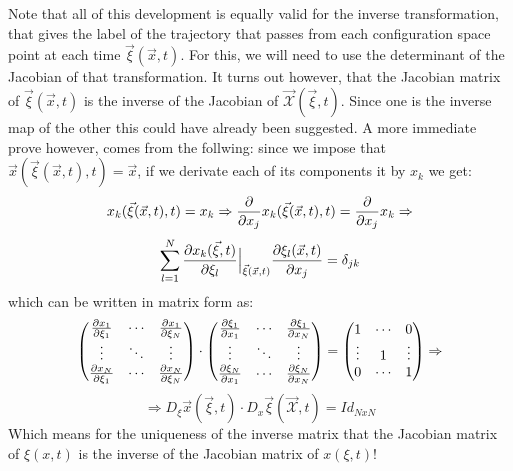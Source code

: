 \documentclass[11pt, a4paper]{article} %
\newcommand{\x}{\mathcal{X}}
\begin{document}
{Note that all of this development is equally valid for the inverse transformation, that gives the label of the trajectory that passes from each configuration space point at each time $\vec{\xi}(\vec{x},t)$. For this, we will need to use the determinant of the Jacobian of that transformation. It turns out however, that the Jacobian matrix of $\vec{\xi}(\vec{x},t)$ is the inverse of the Jacobian of $\vec{\x}(\vec{\xi},t)$. Since one is the inverse map of the other this could have already been suggested. A more immediate prove however, comes from the follwing: since we impose that $\vec{x}(\vec{\xi}(\vec{x},t),t)=\vec{x}$, if we derivate each of its components it by $x_k$ we get:
\begin{equation}
x_k(\vec{\xi}(\vec{x},t),t)=x_k \Rightarrow \pdv{}{x_j}x_k(\vec{\xi}(\vec{x},t),t)=\pdv{}{x_j}x_k \Rightarrow
\end{equation}
$$
\sum_{l=1}^N \pdv{x_k(\vec{\xi},t)}{\xi_l}\Big\rvert_{\vec{\xi}(\vec{x},t)}\pdv{\xi_l(\vec{x},t)}{x_j}=\delta_{jk}
$$
which can be written in matrix form as:
\begin{equation}
\begin{pmatrix}
\pdv{x_1}{\xi_1}&\cdots&\pdv{x_1}{\xi_N} \\
\vdots &\ddots& \vdots \\
\pdv{x_N}{\xi_1}&\cdots&\pdv{x_N}{\xi_N}
\end{pmatrix}\cdot \begin{pmatrix}
\pdv{\xi_1}{x_1}&\cdots&\pdv{\xi_1}{x_N} \\
\vdots & \ddots & \vdots \\
\pdv{\xi_N}{x_1}&\cdots&\pdv{\xi_N}{x_N}
\end{pmatrix}=\begin{pmatrix}
1&\cdots &0 \\
\vdots & 1& \vdots \\
0&\cdots &1
\end{pmatrix}\Rightarrow
\end{equation}
$$
\Rightarrow D_\xi \vec{x}(\vec{\xi},t)\cdot D_x \vec{\xi}(\vec{\x},t) = Id_{NxN}
$$
Which means for the uniqueness of the inverse matrix that the Jacobian matrix of $\xi(x,t)$ is the inverse of the Jacobian matrix of $x(\xi,t)$! }
\end{document}

